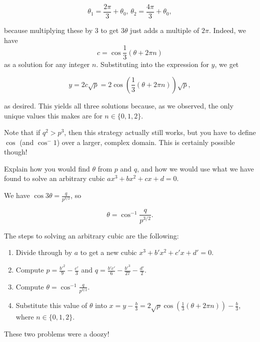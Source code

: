 \documentclass[../key.tex]{subfiles}
\begin{document}
$$\theta_1 = \frac{2\pi}{3} + \theta_0, \, \theta_2 = \frac{4\pi}{3} + \theta_0,$$

because multiplying these by $3$ to get $3\theta$ just adds a multiple of $2\pi$. Indeed, we have $$c = \cos\frac{1}{3}\left(\theta + 2\pi n\right)$$ as a solution for any integer $n$. Substituting into the expression for $y$, we get

$$y=2c\sqrt{p}=2\cos\left(\frac{1}{3}(\theta + 2\pi n)\right)\sqrt{p},$$

as desired. This yields all three solutions because, as we observed, the only unique values this makes are for $n\in \{0,1,2\}$.

Note that if $q^2 > p^3$, then this strategy actually still works, but you have to define $\cos$ (and $\cos^-1$) over a larger, complex domain. This is certainly possible though!

\begin{inner_problem}
\item Explain how you would find $\theta$ from $p$ and $q$, and how we would use what we have found to solve an arbitrary cubic $ax^3+bx^2+cx+d=0$.
\end{inner_problem}

We have $\cos 3\theta = \frac{q}{p^{3/2}}$, so

$$\theta = \cos^{-1} \frac{q}{p^{3/2}}.$$

The steps to solving an arbitrary cubic are the following:

\begin{enumerate}
\item Divide through by $a$ to get a new cubic $x^3 + b'x^2 + c'x + d' = 0$.
\item Compute $p = \frac{b'^2}{9} - \frac{c'}{3}$ and $q=\frac{b'c'}{6} - \frac{b'^3}{27} - \frac{d'}{2}$.
\item Compute $\theta = \cos^{-1} \frac{q}{p^{3/2}}$.
\item Substitute this value of $\theta$ into $x=y-\frac{b}{3}=2\sqrt{p}\cos\left(\frac{1}{3}(\theta+2\pi n)\right)-\frac{b}{3}$, where $n\in \{0,1,2\}$.
\end{enumerate}

These two problems were a doozy!
\end{document}
